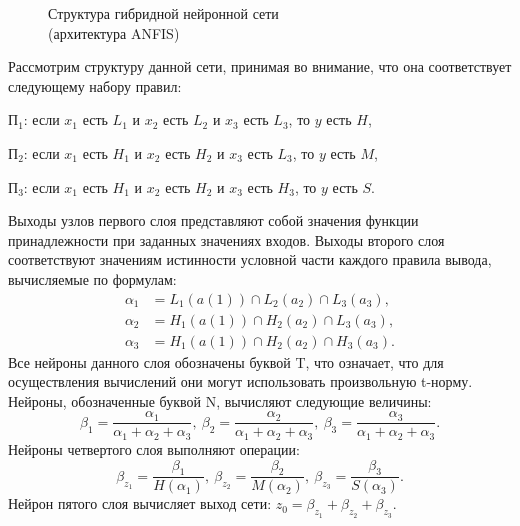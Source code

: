 \begin{figure}[h!]
  \centering
  \caption{Структура гибридной нейронной сети \\ (архитектура ANFIS)}
  \label{fig:anfis}
\end{figure}

Рассмотрим структуру данной сети, принимая во внимание, что она соответствует
следующему набору правил: \par
\( \text{П}_1 \): если
\( x_1 \) есть \( L_1 \) и
\( x_2 \) есть \( L_2 \) и
\( x_3 \) есть \( L_3 \),
то \( y \) есть \( H \), \par
\( \text{П}_2 \): если
\( x_1 \) есть \( H_1 \) и
\( x_2 \) есть \( H_2 \) и
\( x_3 \) есть \( L_3 \),
то \( y \) есть \( M \), \par
\( \text{П}_3 \): если
\( x_1 \) есть \( H_1 \) и
\( x_2 \) есть \( H_2 \) и
\( x_3 \) есть \( H_3 \),
то \( y \) есть \( S \).

Выходы узлов первого слоя представляют собой значения функции
принадлежности при заданных значениях входов.
Выходы второго слоя соответствуют значениям истинности условной части
каждого правила вывода, вычисляемые по формулам:
\[
  \begin{aligned}
    \alpha_1 &= L_1(a(1)) \cap L_2(a_2) \cap L_3(a_3), \\
    \alpha_2 &= H_1(a(1)) \cap H_2(a_2) \cap L_3(a_3), \\
    \alpha_3 &= H_1(a(1)) \cap H_2(a_2) \cap H_3(a_3).
  \end{aligned}
\]
Все нейроны данного слоя обозначены буквой T, что означает,
что для осуществления вычислений они могут использовать
произвольную t-норму.
Нейроны, обозначенные буквой N, вычисляют следующие величины:
\[
  \beta_1 = \dfrac{\alpha_1}{\alpha_1 + \alpha_2 + \alpha_3}, \:
  \beta_2 = \dfrac{\alpha_2}{\alpha_1 + \alpha_2 + \alpha_3}, \:
  \beta_3 = \dfrac{\alpha_3}{\alpha_1 + \alpha_2 + \alpha_3}.
\]
Нейроны четвертого слоя выполняют операции:
\[
  \beta_{z_1} = \dfrac{\beta_1}{H(\alpha_1)}, \:
  \beta_{z_2} = \dfrac{\beta_2}{M(\alpha_2)}, \:
  \beta_{z_3} = \dfrac{\beta_3}{S(\alpha_3)}.
\]
Нейрон пятого слоя вычисляет выход сети:
\( z_0 = \beta_{z_1} + \beta_{z_2} + \beta_{z_3}. \)

